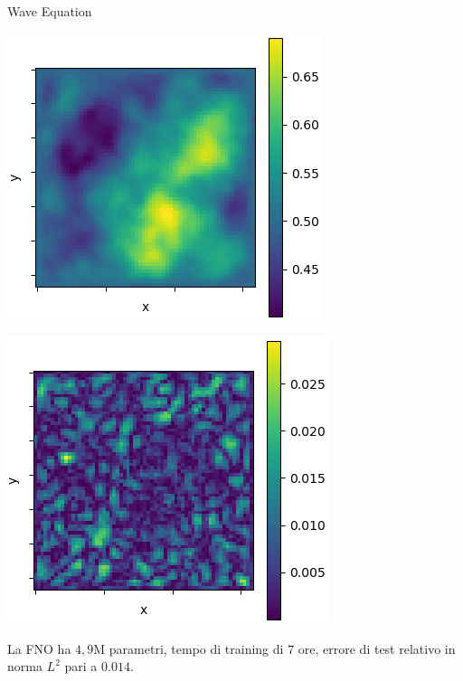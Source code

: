 \documentclass[aspectratio=169]{beamer}
\begin{document}
\begin{frame}[t]{Wave Equation}
\begin{center}
\begin{minipage}{0.24\textwidth}
        \end{minipage}
        \hfill
        \begin{minipage}{0.24\textwidth}
            \includegraphics[width=\textwidth]{operators/wave/FNOappro.png}
        \end{minipage}
        \hfill
        \begin{minipage}{0.24\textwidth}
            \includegraphics[width=\textwidth]{operators/wave/error.png}
        \end{minipage}
    \end{center}
    La FNO ha $4, 9$M parametri, tempo di training di $7$ ore, errore di test relativo in norma $L^{2}$ pari a $0.014$.
\end{frame}
\end{document}
